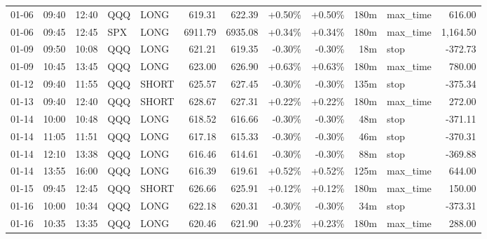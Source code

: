 \documentclass[11pt,a4paper,twoside]{article}
\begin{document}
\begin{center}
\begin{longtable}{>{\color{txtmain}}l l l l l r r r r r >{\color{txtmain}}l r}
01-06 & 09:40 & 12:40 & QQQ & LONG & 619.31 & 622.39 & \textcolor{wingreen}{+0.50\%} & \textcolor{wingreen}{+0.50\%} & 180m & max\_time & \textcolor{wingreen}{616.00} \\
01-06 & 09:45 & 12:45 & SPX & LONG & 6911.79 & 6935.08 & \textcolor{wingreen}{+0.34\%} & \textcolor{wingreen}{+0.34\%} & 180m & max\_time & \textcolor{wingreen}{1,164.50} \\
01-09 & 09:50 & 10:08 & QQQ & LONG & 621.21 & 619.35 & \textcolor{lossred}{-0.30\%} & \textcolor{lossred}{-0.30\%} & 18m & stop & \textcolor{lossred}{-372.73} \\
01-09 & 10:45 & 13:45 & QQQ & LONG & 623.00 & 626.90 & \textcolor{wingreen}{+0.63\%} & \textcolor{wingreen}{+0.63\%} & 180m & max\_time & \textcolor{wingreen}{780.00} \\
01-12 & 09:40 & 11:55 & QQQ & SHORT & 625.57 & 627.45 & \textcolor{lossred}{-0.30\%} & \textcolor{lossred}{-0.30\%} & 135m & stop & \textcolor{lossred}{-375.34} \\
01-13 & 09:40 & 12:40 & QQQ & SHORT & 628.67 & 627.31 & \textcolor{wingreen}{+0.22\%} & \textcolor{wingreen}{+0.22\%} & 180m & max\_time & \textcolor{wingreen}{272.00} \\
01-14 & 10:00 & 10:48 & QQQ & LONG & 618.52 & 616.66 & \textcolor{lossred}{-0.30\%} & \textcolor{lossred}{-0.30\%} & 48m & stop & \textcolor{lossred}{-371.11} \\
01-14 & 11:05 & 11:51 & QQQ & LONG & 617.18 & 615.33 & \textcolor{lossred}{-0.30\%} & \textcolor{lossred}{-0.30\%} & 46m & stop & \textcolor{lossred}{-370.31} \\
01-14 & 12:10 & 13:38 & QQQ & LONG & 616.46 & 614.61 & \textcolor{lossred}{-0.30\%} & \textcolor{lossred}{-0.30\%} & 88m & stop & \textcolor{lossred}{-369.88} \\
01-14 & 13:55 & 16:00 & QQQ & LONG & 616.39 & 619.61 & \textcolor{wingreen}{+0.52\%} & \textcolor{wingreen}{+0.52\%} & 125m & max\_time & \textcolor{wingreen}{644.00} \\
01-15 & 09:45 & 12:45 & QQQ & SHORT & 626.66 & 625.91 & \textcolor{wingreen}{+0.12\%} & \textcolor{wingreen}{+0.12\%} & 180m & max\_time & \textcolor{wingreen}{150.00} \\
01-16 & 10:00 & 10:34 & QQQ & LONG & 622.18 & 620.31 & \textcolor{lossred}{-0.30\%} & \textcolor{lossred}{-0.30\%} & 34m & stop & \textcolor{lossred}{-373.31} \\
01-16 & 10:35 & 13:35 & QQQ & LONG & 620.46 & 621.90 & \textcolor{wingreen}{+0.23\%} & \textcolor{wingreen}{+0.23\%} & 180m & max\_time & \textcolor{wingreen}{288.00} \\

\end{longtable}
\end{center}
\end{document}
